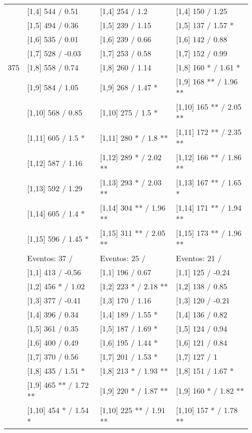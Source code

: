 \begin{table}
\begin{tabular}[t]{llll}
\addlinespace
 & {}[1,4] 544  / 0.51 & {}[1,4] 254  / 1.2 & {}[1,4] 150  / 1.25\\
 & {}[1,5] 494  / 0.36 & {}[1,5] 239  / 1.15 & {}[1,5] 137  / 1.57 *\\
 & {}[1,6] 535  / 0.01 & {}[1,6] 239  / 0.66 & {}[1,6] 142  / 0.88\\
 & {}[1,7] 528  / -0.03 & {}[1,7] 253  / 0.58 & {}[1,7] 152  / 0.99\\
375 & {}[1,8] 558  / 0.74 & {}[1,8] 260  / 1.14 & {}[1,8] 160 * / 1.61 *\\
\addlinespace
 & {}[1,9] 584  / 1.05 & {}[1,9] 268  / 1.47 * & {}[1,9] 168 ** / 1.96 **\\
 & {}[1,10] 568  / 0.85 & {}[1,10] 275  / 1.5 * & {}[1,10] 165 ** / 2.05 **\\
 & {}[1,11] 605  / 1.5 * & {}[1,11] 280 * / 1.8 ** & {}[1,11] 172 ** / 2.35 **\\
 & {}[1,12] 587  / 1.16 & {}[1,12] 289 * / 2.02 ** & {}[1,12] 166 ** / 1.86 **\\
 & {}[1,13] 592  / 1.29 & {}[1,13] 293 * / 2.03 ** & {}[1,13] 167 ** / 1.65 *\\
\addlinespace
 & {}[1,14] 605  / 1.4 * & {}[1,14] 304 ** / 1.96 ** & {}[1,14] 171 ** / 1.94 **\\
 & {}[1,15] 596  / 1.45 * & {}[1,15] 311 ** / 2.05 ** & {}[1,15] 173 ** / 1.96 **\\
 & Eventos:  37 / & Eventos:  25 / & Eventos:  21 /\\
 & {}[1,1] 413  / -0.56 & {}[1,1] 196  / 0.67 & {}[1,1] 125  / -0.24\\
 & {}[1,2] 456 * / 1.02 & {}[1,2] 223 * / 2.18 ** & {}[1,2] 138  / 0.85\\
\addlinespace
 & {}[1,3] 377  / -0.41 & {}[1,3] 170  / 1.16 & {}[1,3] 120  / -0.21\\
 & {}[1,4] 396  / 0.34 & {}[1,4] 189  / 1.55 * & {}[1,4] 136  / 0.82\\
 & {}[1,5] 361  / 0.35 & {}[1,5] 187  / 1.69 * & {}[1,5] 124  / 0.94\\
 & {}[1,6] 400  / 0.49 & {}[1,6] 195  / 1.44 * & {}[1,6] 121  / 0.84\\
 & {}[1,7] 370  / 0.56 & {}[1,7] 201  / 1.53 * & {}[1,7] 127  / 1\\
\addlinespace
500 & {}[1,8] 435  / 1.51 * & {}[1,8] 213 * / 1.93 ** & {}[1,8] 151  / 1.67 *\\
 & {}[1,9] 465 ** / 1.72 ** & {}[1,9] 220 * / 1.87 ** & {}[1,9] 160 * / 1.82 **\\
 & {}[1,10] 454 * / 1.54 * & {}[1,10] 225 ** / 1.91 ** & {}[1,10] 157 * / 1.78 **\\

\end{tabular}
\end{table}
